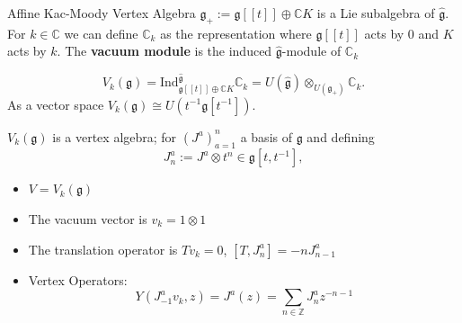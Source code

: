 \documentclass{beamer}
\newcommand{\C}{\mathbb{C}}
\newcommand{\Z}{\mathbb{Z}}
\begin{document}
\begin{frame}{Affine Kac-Moody Vertex Algebra}
    $\mathfrak{g}_{+}:=\mathfrak{g}[[t]] \oplus \C K$ is a Lie subalgebra of $\hat{\mathfrak{g}}$. For $k\in \C$ we can define $\C_k$ as the representation where $\mathfrak{g}[[t]]$ acts by 0 and $K$ acts by $k$. The \textbf{vacuum module} is the induced $\hat{\mathfrak{g}}$-module of $\C_k$

    \[
        V_{k}(\mathfrak{g}) = \mbox{Ind}_{\mathfrak{g}[[t]]\oplus \C K}^{\hat{\mathfrak{g}}} \C_k = U(\hat{\mathfrak{g}})\otimes_{U(\mathfrak{g}_{+})}\C_k.
    \]
    As a vector space $V_k(\mathfrak{g})\cong U(t^{-1}\mathfrak{g}[t^{-1}])$. \pause 
    
    
         $V_k(\mathfrak{g})$ is a vertex algebra; for $(J^a)_{a=1}^n$ a basis of $\mathfrak{g}$ and defining
    \[
        J^a_n:= J^a \otimes t^n \in \mathfrak{g}[t,t^{-1}],
    \]
        \begin{itemize}


        \item $V = V_k (\mathfrak{g})$
        \item The vacuum vector is $v_k=1\otimes 1$
        \item The translation operator is $T v_k = 0$, $[T,J^a_n]=-n J^a_{n-1}$
        \item Vertex Operators:
              \[
                  Y(J^a_{-1} v_k, z) = J^a(z) = \sum_{n \in \Z} J^a_{n}z^{-n-1}
              \]
    \end{itemize}
\end{frame}

\end{document}
